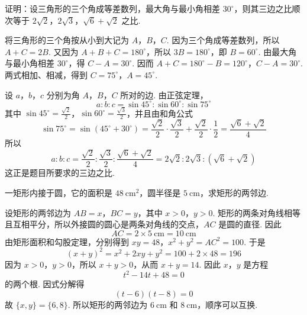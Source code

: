 \begin{problem}
证明：设三角形的三个角成等差数列，最大角与最小角相差 \(30^{\circ}\)，则其三边之比顺次等于 \(2\sqrt{2}\)，\(2\sqrt{3}\)，\(\sqrt{6}+\sqrt{2}\) 之比.
\end{problem}

\begin{solution}
将三角形的三个角按从小到大记为 \(A\)，\(B\)，\(C\). 因为三个角成等差数列，所以 \(A+C=2B\). 又因为 \(A+B+C=180^{\circ}\)，所以 \(3B=180^{\circ}\)，即 \(B=60^{\circ}\). 由最大角与最小角相差 \(30^{\circ}\)，得 \(C-A=30^{\circ}\). 因而
\(A+C=180^{\circ}-B=120^{\circ}\)，\(C-A=30^{\circ}\).
两式相加、相减，得到 \(C=75^{\circ}\)，\(A=45^{\circ}\).

设 \(a\)，\(b\)，\(c\) 分别为角 \(A\)，\(B\)，\(C\) 所对的边. 由正弦定理，
\[
a:b:c=\sin45^{\circ}:\sin60^{\circ}:\sin75^{\circ}
\]
其中 \(\sin45^{\circ}=\frac{\sqrt{2}}{2}\)，\(\sin60^{\circ}=\frac{\sqrt{3}}{2}\)，并且由和角公式
\[
\sin75^{\circ}=\sin\left(45^{\circ}+30^{\circ}\right)=\frac{\sqrt{2}}{2}\cdot\frac{\sqrt{3}}{2}+\frac{\sqrt{2}}{2}\cdot\frac{1}{2}=\frac{\sqrt{6}+\sqrt{2}}{4}
\]
所以
\[
a:b:c=\frac{\sqrt{2}}{2}:\frac{\sqrt{3}}{2}:\frac{\sqrt{6}+\sqrt{2}}{4}=2\sqrt{2}:2\sqrt{3}:\left(\sqrt{6}+\sqrt{2}\right)
\]
这正是题目所要求的三边之比.

\end{solution}

\begin{problem}
一矩形内接于圆，它的面积是 \(48\mathrm{~cm}^{2}\)，圆半径是 \(5\mathrm{~cm}\)，求矩形的两邻边.
\end{problem}

\begin{solution}

设矩形的两邻边为 \(AB=x\)，\(BC=y\)，其中 \(x>0\)，\(y>0\). 矩形的两条对角线相等且互相平分，所以外接圆的圆心是两条对角线的交点，\(AC\) 是圆的直径. 因此
\[
AC=2\times5\mathrm{~cm}=10\mathrm{~cm}
\]
由矩形面积和勾股定理，分别得到
\(xy=48\)，\(x^{2}+y^{2}=AC^{2}=100\).
于是
\[
(x+y)^{2}=x^{2}+2xy+y^{2}=100+2\times48=196
\]
因为 \(x>0\)，\(y>0\)，所以 \(x+y>0\)，从而 \(x+y=14\). 因此 \(x\)，\(y\) 是方程
\[
t^{2}-14t+48=0
\]
的两个根. 因式分解得
\[
(t-6)(t-8)=0
\]
故 \(\{x,y\}=\{6,8\}\). 所以矩形的两邻边为 \(6\mathrm{~cm}\) 和 \(8\mathrm{~cm}\)，顺序可以互换.
\end{solution}

